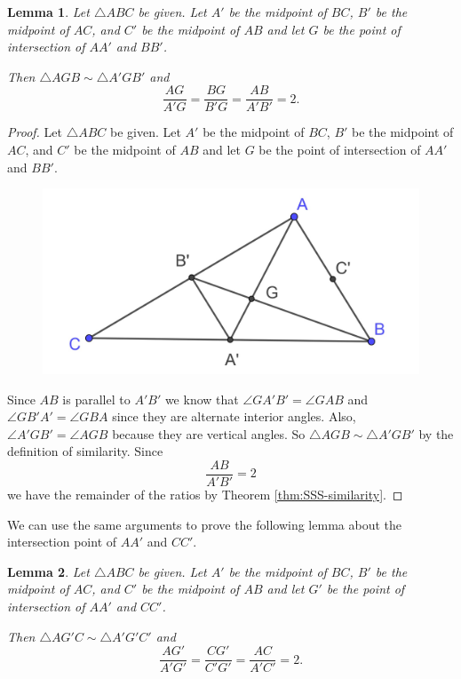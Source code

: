 \documentclass[
]{book}
\newtheorem{lemma}{Lemma}[chapter]
\theoremstyle{definition}
\theoremstyle{definition}
\theoremstyle{definition}
\theoremstyle{definition}
\theoremstyle{remark}
\begin{document}
\begin{lemma}
Let \(\triangle ABC\) be given. Let \(A'\) be the midpoint of \(BC\), \(B'\) be the midpoint of \(AC\), and \(C'\) be the midpoint of \(AB\) and let \(G\) be the point of intersection of \(AA'\) and \(BB'\).

Then \(\triangle AGB \sim \triangle A'GB'\) and \[\frac{AG}{A'G} = \frac{BG}{B'G} = \frac{AB}{A'B'} = 2.\]
\end{lemma}

\begin{proof}
Let \(\triangle ABC\) be given. Let \(A'\) be the midpoint of \(BC\), \(B'\) be the midpoint of \(AC\), and \(C'\) be the midpoint of \(AB\) and let \(G\) be the point of intersection of \(AA'\) and \(BB'\).

\begin{figure}

{\centering \includegraphics[width=0.4\linewidth]{images/centroid2} 

}

\end{figure}

Since \(AB\) is parallel to \(A'B'\) we know that \(\angle GA'B' = \angle GAB\) and \(\angle GB'A' = \angle GBA\) since they are alternate interior angles. Also, \(\angle A'GB' = \angle AGB\) because they are vertical angles. So \(\triangle AGB \sim \triangle A'GB'\) by the definition of similarity. Since \[\frac{AB}{A'B'} = 2\] we have the remainder of the ratios by Theorem \ref{thm:SSS-similarity}.
\end{proof}

We can use the same arguments to prove the following lemma about the intersection point of \(AA'\) and \(CC'\).

\begin{lemma}
Let \(\triangle ABC\) be given. Let \(A'\) be the midpoint of \(BC\), \(B'\) be the midpoint of \(AC\), and \(C'\) be the midpoint of \(AB\) and let \(G'\) be the point of intersection of \(AA'\) and \(CC'\).

Then \(\triangle AG'C \sim \triangle A'G'C'\) and \[\frac{AG'}{A'G'} = \frac{CG'}{C'G'} = \frac{AC}{A'C'} = 2.\]
\end{lemma}
\end{document}
